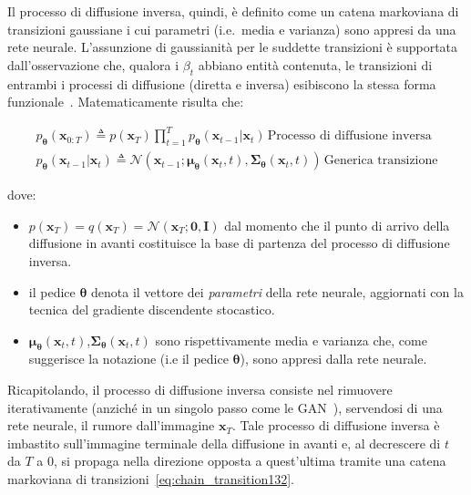 \noindent Il processo di diffusione inversa, quindi, è definito come un catena markoviana di transizioni gaussiane i cui parametri
(i.e.\ media e varianza) sono appresi 
da una rete neurale. L'assunzione di gaussianità per le suddette transizioni è supportata 
dall'osservazione che, qualora i $\beta_t$ abbiano entità contenuta, le transizioni di entrambi i processi 
di diffusione (diretta e inversa) esibiscono la stessa forma funzionale~\cite{fellerTheoryStochasticProcesses1949}.
Matematicamente risulta che:
\noindent 
\begin{Mybox1}
\begin{gather}
    p_{\bm{\theta}}(\mathbf{x}_{0:T})   \triangleq p(\mathbf{x}_T)\prod\limits_{t=1}^{T}p_{\bm{\theta}}(\mathbf{x}_{t-1}|\mathbf{x}_t) \, \text{Processo di diffusione inversa} \label{eq:reverse_process} \\
    p_{\bm{\theta}}(\mathbf{x}_{t-1}|\mathbf{x}_t) \triangleq \mathcal{N}(\mathbf{x}_{t-1}; \bm{\mu}_{\bm{\theta}}(\mathbf{x}_t,t),\bm{\Sigma}_{\bm{\theta}}(\mathbf{x}_t,t)) \,  \text{Generica transizione}\label{eq:chain_transition132}
\end{gather}
\end{Mybox1}
\noindent dove:
\begin{itemize}
\item $p(\mathbf{x}_T)=q(\mathbf{x}_T)=\mathcal{N}(\mathbf{x}_T;\bm{0},\bm{I})$ dal momento 
che il punto di arrivo della diffusione in avanti costituisce la base di partenza del processo di diffusione inversa.
\item il pedice $\bm{\theta}$ denota il vettore dei \emph{parametri} della rete neurale, aggiornati con la tecnica del gradiente discendente stocastico.
\item $\bm{\mu}_{\bm{\theta}}(\mathbf{x}_t,t)$,$\bm{\Sigma}_{\bm{\theta}}(\mathbf{x}_t,t)$ 
sono rispettivamente media e varianza che, come suggerisce la notazione (i.e il pedice $\bm{\theta}$), sono appresi dalla rete neurale.
\end{itemize}

\bigskip
\noindent Ricapitolando, il processo di diffusione inversa consiste nel rimuovere 
iterativamente (anziché in un singolo passo come le GAN~\cite{changDesignFundDiffusion2023}), servendosi di una rete neurale, 
il rumore dall'immagine $\mathbf{x}_T$. Tale processo di diffusione inversa è imbastito sull'immagine terminale della diffusione in avanti
e, al decrescere di $t$ da $T$ a $0$, si propaga nella direzione opposta a quest'ultima tramite una catena markoviana 
di transizioni~\eqref{eq:chain_transition132}.